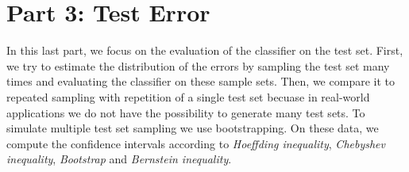 \documentclass[a4paper,11pt]{article}
\begin{document}
\section{Part 3: Test Error}
In this last part, we focus on the evaluation of the classifier on the test set.
First, we try to estimate the distribution of the errors by sampling the test set many times and evaluating the classifier on these sample sets.
Then, we compare it to repeated sampling with repetition of a single test set becuase in real-world applications we do not have the possibility to generate many test sets.
To simulate multiple test set sampling we use bootstrapping.
On these data, we compute the confidence intervals according to \textit{Hoeffding inequality}, \textit{Chebyshev inequality}, \textit{Bootstrap} and \textit{Bernstein inequality}.
\end{document}
